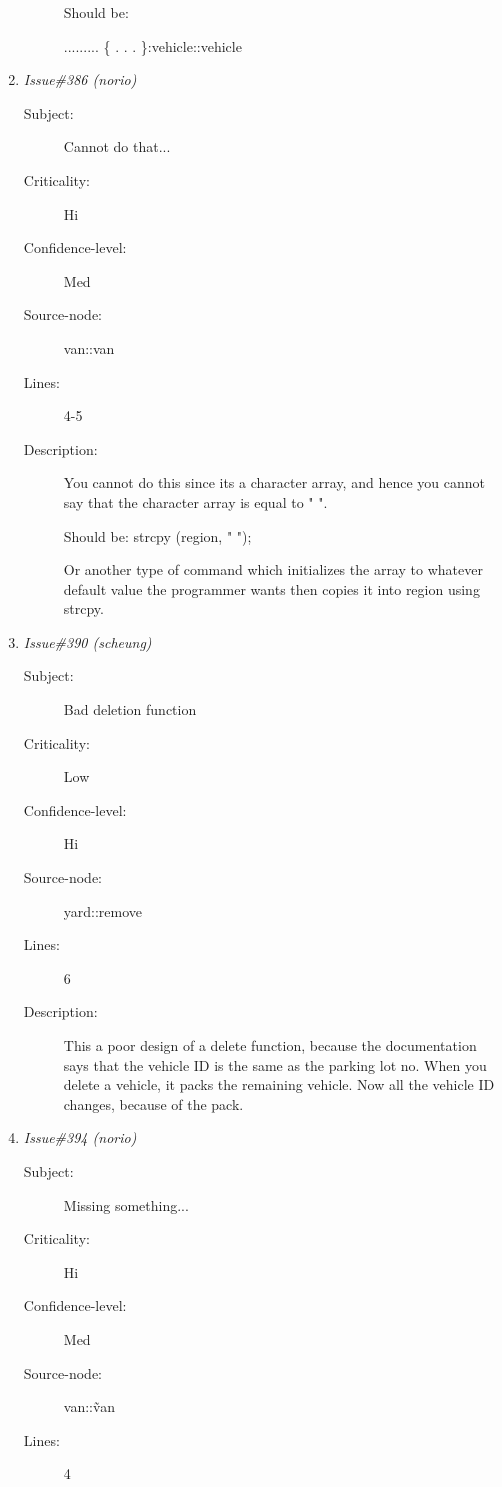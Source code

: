 \begin{enumerate}
\begin{description}
 Should be:

 .........
 \{
  .
  .
  .
 \}:vehicle::vehicle
\end{description}
\item {\it Issue\#386 (norio)}
\begin{description}
\item [Subject:] Cannot do that...
\item [Criticality:] Hi
\item [Confidence-level:] Med
\item [Source-node:] van::van

\item [Lines:] 4-5

\item [Description:] You cannot do this since its a character array, and hence
 you cannot say that the character array is equal to " ".

 Should be:
 strcpy (region, " ");

 Or another type of command which initializes the array to
 whatever default value the programmer wants then copies
 it into region using strcpy.
\end{description}
\item {\it Issue\#390 (scheung)}
\begin{description}
\item [Subject:] Bad deletion function
\item [Criticality:] Low
\item [Confidence-level:] Hi
\item [Source-node:] yard::remove

\item [Lines:] 6

\item [Description:] This a poor design of a delete function,
because the documentation says that the vehicle ID is the same as the parking
lot no.  When you delete a vehicle, it packs the remaining vehicle.  Now all
the vehicle ID changes, because of the pack.
\end{description}
\item {\it Issue\#394 (norio)}
\begin{description}
\item [Subject:] Missing something...
\item [Criticality:] Hi
\item [Confidence-level:] Med
\item [Source-node:] van::\~van

\item [Lines:] 4


\end{description}
\end{enumerate}
